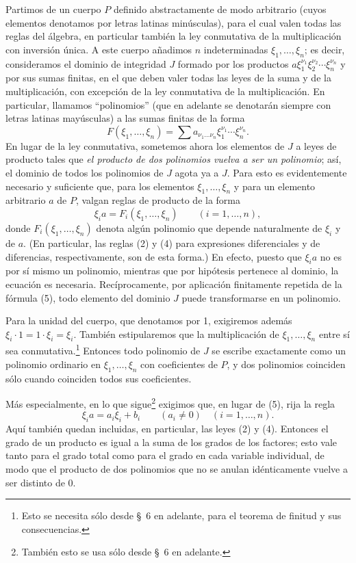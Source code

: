 \documentclass[11pt]{article}
\begin{document}
Partimos de un cuerpo $P$ definido abstractamente de modo arbitrario (cuyos elementos denotamos por letras latinas minúsculas), para el cual valen todas las reglas del álgebra, en particular también la ley conmutativa de la multiplicación con inversión única. A este cuerpo añadimos $n$ indeterminadas $\xi_1,\ldots,\xi_n$; es decir, consideramos el dominio de integridad $J$ formado por los productos $a\xi_1^{\nu_1}\xi_2^{\nu_2}\cdots\xi_n^{\nu_n}$ y por sus sumas finitas, en el que deben valer todas las leyes de la suma y de la multiplicación, con excepción de la ley conmutativa de la multiplicación. En particular, llamamos ``polinomios'' (que en adelante se denotarán siempre con letras latinas mayúsculas) a las sumas finitas de la forma
\[
 F(\xi_1,\ldots,\xi_n)=\sum a_{\nu_1\ldots\nu_n}\xi_1^{\nu_1}\cdots\xi_n^{\nu_n}.
\]
En lugar de la ley conmutativa, sometemos ahora los elementos de $J$ a leyes de producto tales que \emph{el producto de dos polinomios vuelva a ser un polinomio}; así, el dominio de todos los polinomios de $J$ agota ya a $J$. Para esto es evidentemente necesario y suficiente que, para los elementos $\xi_1,\ldots,\xi_n$ y para un elemento arbitrario $a$ de $P$, valgan reglas de producto de la forma
\begin{equation}
 \xi_i a=F_i(\xi_1,\ldots,\xi_n)\qquad (i=1,\ldots,n),
\tag{5}
\end{equation}
donde $F_i(\xi_1,\ldots,\xi_n)$ denota algún polinomio que depende naturalmente de $\xi_i$ y de $a$. (En particular, las reglas (2) y (4) para expresiones diferenciales y de diferencias, respectivamente, son de esta forma.) En efecto, puesto que $\xi_i a$ no es por sí mismo un polinomio, mientras que por hipótesis pertenece al dominio, la ecuación es necesaria. Recíprocamente, por aplicación finitamente repetida de la fórmula (5), todo elemento del dominio $J$ puede transformarse en un polinomio.

Para la unidad del cuerpo, que denotamos por 1, exigiremos además $\xi_i\cdot1=1\cdot\xi_i=\xi_i$. También estipularemos que la multiplicación de $\xi_1,\ldots,\xi_n$ entre sí sea conmutativa.\footnote{Esto se necesita sólo desde \S~6 en adelante, para el teorema de finitud y sus consecuencias.} Entonces todo polinomio de $J$ se escribe exactamente como un polinomio ordinario en $\xi_1,\ldots,\xi_n$ con coeficientes de $P$, y dos polinomios coinciden sólo cuando coinciden todos sus coeficientes.

Más especialmente, en lo que sigue\footnote{También esto se usa sólo desde \S~6 en adelante.} exigimos que, en lugar de (5), rija la regla
\begin{equation}
 \xi_i a=a_i\xi_i+b_i\qquad (a_i\ne0)\quad(i=1,\ldots,n).
\tag{6}
\end{equation}
Aquí también quedan incluidas, en particular, las leyes (2) y (4). Entonces el grado de un producto es igual a la suma de los grados de los factores; esto vale tanto para el grado total como para el grado en cada variable individual, de modo que el producto de dos polinomios que no se anulan idénticamente vuelve a ser distinto de 0.
\end{document}
